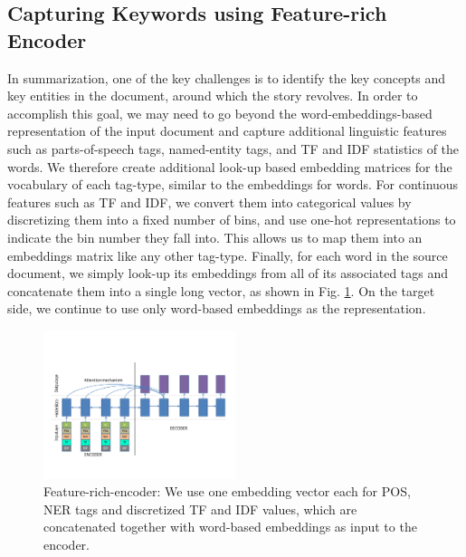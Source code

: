 \subsection{Capturing Keywords using Feature-rich Encoder}\label{sec:feats}
In summarization, one of the key challenges is to identify the key concepts and key entities in the document, around which the story revolves. In order to accomplish this goal, we may need to go beyond the word-embeddings-based representation of the input document and capture additional linguistic features such as parts-of-speech tags, named-entity tags, and TF and IDF statistics of the words. We therefore create additional look-up based embedding matrices for the vocabulary of each tag-type, similar to the embeddings for words. For continuous features such as TF and IDF, we convert them into categorical values by discretizing them into a fixed number of bins, and use one-hot representations to indicate the bin number they fall into. This allows us to map them into an embeddings matrix like any other tag-type. Finally, for each word in the source document, we simply look-up its embeddings from all of its associated tags and concatenate them into a single long vector, as shown in Fig. \ref{fig:feature_rich_encoder}.  %
On the target side, we continue to use only word-based embeddings as the representation.

\begin{figure}[ht]
    \vspace{-0.3in}
	\centering
  \includegraphics[width=0.5\textwidth]{feature_rich_encoder.PDF}
  \vspace{-0.6in}
	\caption{{\small Feature-rich-encoder: We use one embedding vector each for POS, NER tags and discretized TF and IDF values, which are concatenated together with word-based embeddings as input to the encoder.}}
	\label{fig:feature_rich_encoder}
\end{figure}

